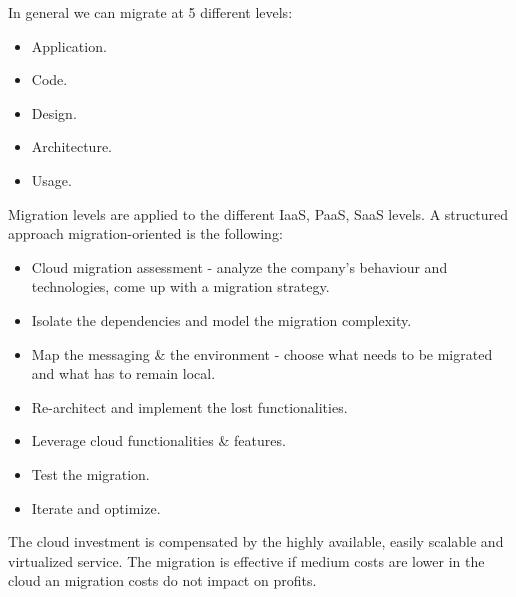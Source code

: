 In general we can migrate at 5 different levels:
\begin{itemize}
    \item Application.
    \item Code.
    \item Design.
    \item Architecture.
    \item Usage.
\end{itemize}
Migration levels are applied to the different IaaS, PaaS, SaaS levels. A structured approach migration-oriented is the following:
\begin{itemize}
    \item Cloud migration assessment - analyze the company's behaviour and technologies, come up
        with a migration strategy.
    \item Isolate the dependencies and model the migration complexity.
    \item Map the messaging \& the environment - choose what needs to be migrated and what has to
        remain local.
    \item Re-architect and implement the lost functionalities.
    \item Leverage cloud functionalities \& features.
    \item Test the migration.
    \item Iterate and optimize.
\end{itemize}
The cloud investment is compensated by the highly available, easily scalable and virtualized service. The migration is effective if medium costs are lower in the cloud an migration costs do not impact on profits.


